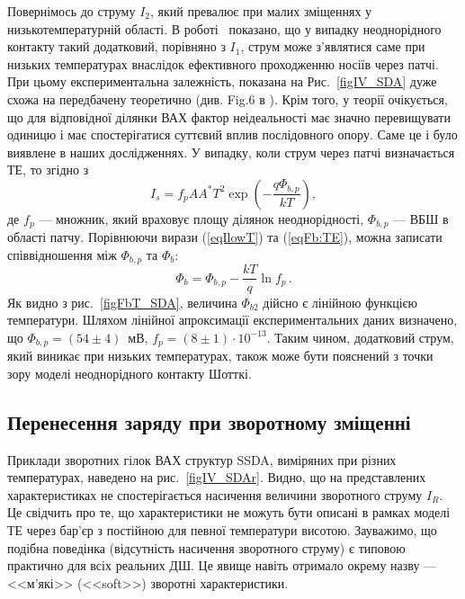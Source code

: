 Повернімось до струму $I_2$, який превалює при малих зміщеннях у низькотемпературній області.
В роботі~\cite{Tung:PhysRev} показано, що у випадку неоднорідного контакту такий додатковий, порівняно з $I_1$, струм
може з'являтися саме при низьких температурах внаслідок ефективного проходженню носіїв через патчі.
При цьому експериментальна залежність, показана на Рис.~\ref{figIV_SDA} дуже схожа на передбачену теоретично (див. Fig.6 в \cite{Tung:PhysRev}).
Крім того, у теорії очікується, що для відповідної ділянки ВАХ фактор неідеальності має значно перевищувати одиницю
і має спостерігатися суттєвий вплив послідовного опору.
Саме це і було виявлене в наших дослідженнях.
У випадку, коли струм через патчі визначається ТЕ, то згідно з \cite{Sarpatwari, Tung:PhysRev}
\begin{equation}\label{eqIlowT}
I_s=f_pAA^*T^2\exp\left(-\frac{q\Phi_{b,p}}{kT}\right),
\end{equation}
де
$f_p$  --- множник, який враховує площу ділянок неоднорідності,
$\Phi_{b,p}$ --- ВБШ в області патчу.
Порівнюючи вирази (\ref{eqIlowT}) та (\ref{eqFb:TE}), можна
записати співвідношення між $\Phi_{b,p}$ та $\Phi_{b}$:
\begin{equation}\label{eqFbFbp}
\Phi_b=\Phi_{b,p}-\frac{kT}{q}\ln{f_p}\,.
\end{equation}
Як видно з рис.~\ref{figFbT_SDA}, величина $\Phi_{b2}$ дійсно є лінійною функцією температури.
Шляхом лінійної апроксимації експериментальних даних визначено, що $\Phi_{b,p}=(54\pm4)$~мВ,
$f_p=(8\pm1)\cdot10^{-13}$.
Таким чином, додатковий струм, який виникає при низьких температурах, також може бути пояснений з точки
зору моделі неоднорідного контакту Шотткі.

\subsection{Перенесення заряду при зворотному зміщенні}

Приклади зворотних гілок ВАХ структур SSDA, виміряних при різних температурах, наведено на рис.~\ref{figIV_SDAr}.
Видно, що на представлених характеристиках не спостерігається насичення величини зворотного струму $I_R$.
Це свідчить про те,
що характеристики не можуть бути описані в рамках моделі ТЕ через бар'єр з постійною для певної температури висотою.
Зауважимо, що подібна поведінка (відсутність насичення зворотного струму) є типовою
практично для всіх реальних ДШ.
Це явище навіть отримало окрему назву --- <<м'які>> (<<soft>>) зворотні характеристики.

